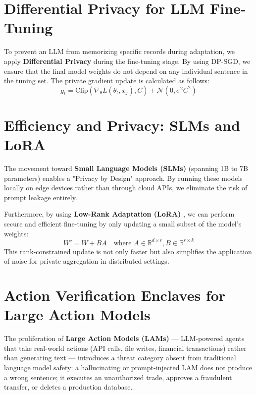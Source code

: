 \section{Differential Privacy for LLM Fine-Tuning}
\label{sec:dp_fine_tuning}

To prevent an LLM from memorizing specific records during adaptation, we apply \textbf{Differential Privacy} during the fine-tuning stage. By using DP-SGD, we ensure that the final model weights do not depend on any individual sentence in the tuning set. The private gradient update is calculated as follows:
\begin{equation}
g_t = \text{Clip}(\nabla_{\theta} L(\theta_t, x_j), C) + \mathcal{N}(0, \sigma^2C^2)
\end{equation}

\section{Efficiency and Privacy: SLMs and LoRA}
\label{sec:slm_privacy_ch15}

The movement toward \textbf{Small Language Models (SLMs)} (spanning 1B to 7B parameters) enables a "Privacy by Design" approach. By running these models locally on edge devices rather than through cloud APIs, we eliminate the risk of prompt leakage entirely.

Furthermore, by using \textbf{Low-Rank Adaptation (LoRA)} \cite{hu2021}, we can perform secure and efficient fine-tuning by only updating a small subset of the model's weights:
\begin{equation}
W' = W + BA \quad \text{where } A \in \mathbb{R}^{d \times r}, B \in \mathbb{R}^{r \times k}
\end{equation}
This rank-constrained update is not only faster but also simplifies the application of noise for private aggregation in distributed settings.

\section{Action Verification Enclaves for Large Action Models}
\label{sec:action_verification_enclaves}

The proliferation of \textbf{Large Action Models (LAMs)} --- LLM-powered agents that take real-world actions (API calls, file writes, financial transactions) rather than generating text --- introduces a threat category absent from traditional language model safety: a hallucinating or prompt-injected LAM does not produce a wrong sentence; it executes an unauthorized trade, approves a fraudulent transfer, or deletes a production database.

